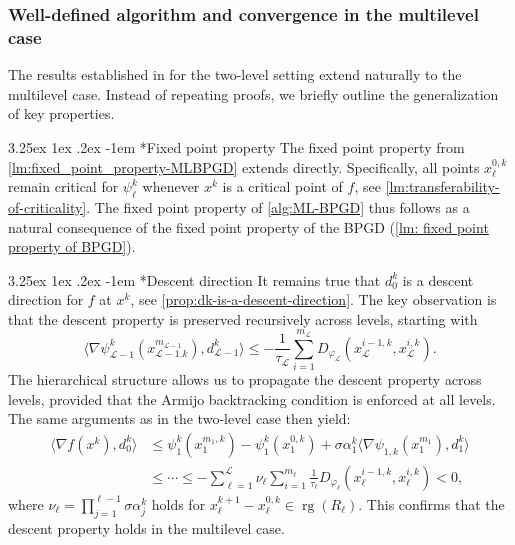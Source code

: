 \documentclass[11pt,reqno]{amsart}
\makeatletter
\numberwithin{equation}{section}
\numberwithin{figure}{section}
\theoremstyle{plain}
\theoremstyle{definition}
\newcommand{\mc}[1]{\mathcal{#1}}
\newcommand{\la}{\langle}
\newcommand{\ra}{\rangle}
\newcommand{\vphi}{\varphi}
\newcommand{\df}{\nabla f}
\DeclareMathOperator{\rg}{rg}
\renewcommand\paragraph{\@startsection{paragraph}{4}{0pt}%
  {3.25ex \@plus 1ex \@minus .2ex}%
  {-1em}
  {\normalfont\itshape}*}
\makeatother
\begin{document}
\subsubsection{Well-defined algorithm and convergence in the multilevel case}

The results established in  for the two-level setting extend naturally to the multilevel case. Instead of repeating proofs, we briefly outline the generalization of key properties.

\paragraph{Fixed point property} 
The fixed point property from \cref{lm:fixed_point_property-MLBPGD} extends directly. Specifically, all points $x_{\ell}^{0,k}$ remain critical for $\psi_{\ell}^k$ whenever $x^k$ is a critical point of $f$, see \cref{lm:transferability-of-criticality}. The fixed point property of \cref{alg:ML-BPGD} thus follows as a natural consequence of the fixed point property of the BPGD (\cref{lm: fixed point property of BPGD}).

\paragraph{Descent direction} 
It remains true that $d_0^k$ is a descent direction for $f$ at $x^k$, see \cref{prop:dk-is-a-descent-direction}. The key observation is that the descent property is preserved recursively across levels, starting with 
\begin{equation}
    \la \nabla \psi^k_{\mc{L}-1}(x_{\mc{L}-1. k}^{m_{\mc{L}-1}}), d_{\mc{L}-1}^k \ra \leq - \frac{1}{\tau_{\mc{L}}}\sum_{i = 1}^{m_\mc{L}} D_{\vphi_{\mc{L}}}(x_{\mc{L}}^{i-1,k}, x_{\mc{L}}^{i,k}). 
\end{equation}
The hierarchical structure allows us to propagate the descent property across  levels, provided that the Armijo backtracking condition is enforced at all levels. The same arguments as in the two-level case then yield:
\begin{align}
    \la \df(x^k), d_{0}^{k} \ra &\leq \psi_{1}^k(x_1^{m_1,k}) - \psi_{1}^k(x_1^{0,k}) + \sigma \alpha_{1}^k \la \nabla \psi_{1,k}(x_1^{m_{1}}), d_{1}^k \ra \\
    & \leq \cdots \leq - \sum_{\ell = 1}^{\mc{L}} \nu_\ell \sum_{i = 1}^{m_\ell} \frac{1}{\tau_\ell} D_{\vphi_\ell}(x_\ell^{i-1,k}, x_\ell^{i,k}) < 0,
\end{align}
where $\nu_\ell = \prod_{j = 1}^{\ell - 1} \sigma \alpha_{j}^k$ holds for $x_{\ell}^{k+1} - x_\ell^{0,k} \in \rg(R_\ell)$. This confirms that the descent property holds in the multilevel case.
\end{document}
